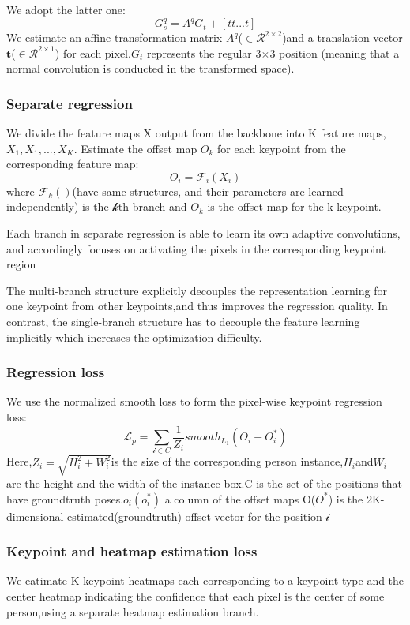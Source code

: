 \documentclass[11pt]{article}
\begin{document}
We adopt the latter one:
$$G_s^q = A^qG_t +[t t ... t]$$
We estimate an affine transformation matrix $A^q$($\in \mathcal{R}^{2\times 2}$)and a translation vector $\textbf{t}$($\in \mathcal{R}^{2\times 1}$) for each pixel.$G_t$ represents the regular 3$\times$3 position (meaning that a normal convolution is conducted in the transformed space).

\subsubsection{Separate regression}
We divide the feature maps X output from the backbone into K feature maps, $X_1,X_1,...,X_K$. Estimate the offset map $O_k$ for each keypoint from the corresponding feature map:
$$O_i = \mathcal{F}_i(X_i)$$
where $\mathcal{F}_k()$(have same structures, and their parameters are learned independently) is the $\mathcal{k}$th branch and $O_k$ is the offset map for the k keypoint.

Each branch in separate regression is able to learn its own adaptive convolutions, and accordingly focuses on activating the pixels in the corresponding keypoint region

The multi-branch structure explicitly decouples the representation learning for one keypoint from other keypoints,and thus improves the regression quality. In contrast, the single-branch structure has to decouple the feature learning implicitly which increases the optimization difficulty.

\subsubsection{Regression loss}
We use the normalized smooth loss to form the pixel-wise keypoint regression loss:
$$\mathcal{L}_p = \sum_{\mathcal{i}\in C}\frac{1}{Z_i}smooth_{L_1}(O_i-O_i^*)$$
Here,$Z_i = \sqrt{H_i^2+W_i^2}$is the size of the corresponding person instance,$H_i$and$W_i$ are the height and the width of the instance box.C is the set of the positions that have groundtruth poses.$o_i(o_i^*)$ a column of the offset maps O($O^*$) is the 2K-dimensional estimated(groundtruth) offset vector for the position $\mathcal{i}$
\subsubsection{Keypoint and heatmap estimation loss}
We eatimate K keypoint heatmaps each corresponding to a keypoint type and the center heatmap indicating the confidence that each pixel is the center of some person,using a separate heatmap estimation branch.
\end{document}
